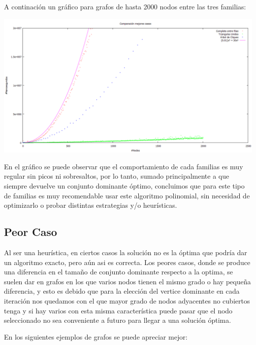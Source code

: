 A continación un gráfico para grafos de hasta 2000 nodos entre las tres familias:

\begin {center}
\includegraphics[width=17cm]{./graficos/goloso-mejorescasos.png}
\end {center} 

En el gráfico se puede observar que el comportamiento de cada familias es muy regular sin picos ni sobresaltos, por lo tanto, sumado principalmente a que siempre devuelve un conjunto dominante óptimo, concluimos que para este tipo de familias es muy recomendable usar este algoritmo polinomial, sin necesidad de optimizarlo o probar distintas estrategias y/o heurísticas.

\subsection{Peor Caso}

Al ser una heurística, en ciertos casos la solución no es la óptima que podría dar un algoritmo exacto, pero aún asi es correcta.
Los peores casos, donde se produce una diferencia en el tamaño de conjunto dominante respecto a la optima, se suelen dar en grafos en los que varios nodos tienen el mismo grado o hay pequeña diferencia, y esto es debido que para la elección del vertice dominante en cada iteración nos quedamos con el que mayor grado de nodos adyacentes no cubiertos tenga y si hay varios con esta misma característica puede pasar que el nodo seleccionado no sea conveniente a futuro para llegar a una solución óptima.

En los siguientes ejemplos de grafos se puede apreciar mejor:

